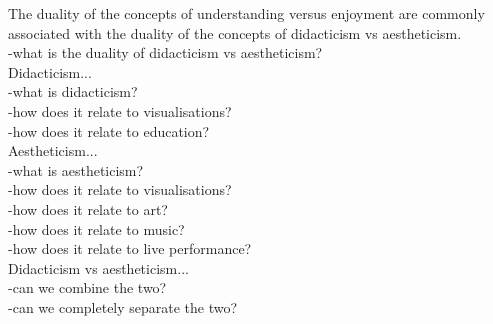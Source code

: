 The duality of the concepts of understanding versus enjoyment are commonly associated with the duality of the concepts of didacticism vs aestheticism.\\
-what is the duality of didacticism vs aestheticism?\\

Didacticism...\\
-what is didacticism?\\
-how does it relate to visualisations?\\
-how does it relate to education?\\

Aestheticism...\\
-what is aestheticism?\\
-how does it relate to visualisations?\\
-how does it relate to art?\\
-how does it relate to music?\\
-how does it relate to live performance?\\

Didacticism vs aestheticism...\\
-can we combine the two?\\
-can we completely separate the two?\\









